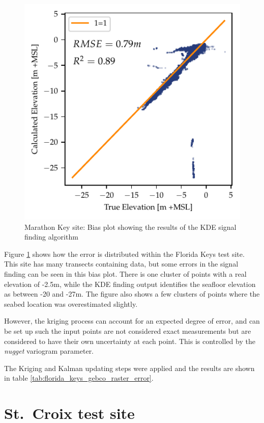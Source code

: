 \begin{figure}[h]
    \centering
    \includegraphics{figures/florida_keys_lidar_estimated_vs_truth.pdf}
    \caption{Marathon Key site: Bias plot showing the results of the KDE signal finding algorithm}
    \label{fig:keys-biasplot}
\end{figure}

Figure \ref{fig:keys-biasplot} shows how the error is distributed within the Florida Keys test site. This site has many transects containing data, but some errors in the signal finding can be seen in this bias plot. There is one cluster of points with a real elevation of -2.5m, while the KDE finding output identifies the seafloor elevation as between -20 and -27m.  The figure also shows a few clusters of points where the seabed location was overestimated slightly. 

However, the kriging process can account for an expected degree of error, and can be set up such the input points are not considered exact measurements but are considered to have their own uncertainty at each point. This is controlled by the \emph{nugget} variogram parameter. 


The Kriging and Kalman updating steps were applied and the results are shown in table \ref{tab:florida_keys_gebco_raster_error}.




\section{St.~Croix test site} \label{sec:stcroix-site}


